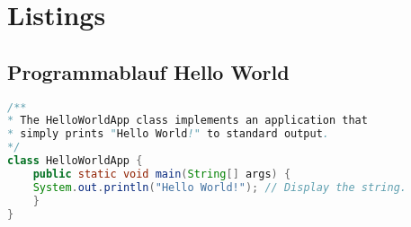 

\chapter{Listings}
\section{Programmablauf Hello World}
\blindtext[1]

\begin{minipage}[t]{\textwidth}
	\begin{lstlisting}[language=Java,style=eclipse-java,label={lst:helloworld-class},caption={Code Fragment of Hello World Class}]
/**
* The HelloWorldApp class implements an application that
* simply prints "Hello World!" to standard output.
*/
class HelloWorldApp {
	public static void main(String[] args) {
	System.out.println("Hello World!"); // Display the string.
	}
}
	\end{lstlisting}
\end{minipage}